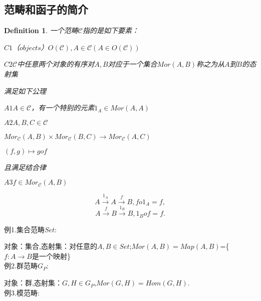 \documentclass[UTF8]{article}
\newtheorem{defn}{Definition}[section]
\begin{document}
\subsection{范畴和函子的简介}
\begin{defn}
一个范畴$\mathscr{C}$指的是如下要素：

\qquad$C1$（$objects$）$O(\mathscr{C}),A\in \mathscr{C}(A\in O(\mathscr{C}))$

\qquad$C2$$\mathscr{C}$中任意两个对象的有序对$A,B$对应于一个集合$Mor(A,B)$称之为从$A$到$B$的态射集

满足如下公理

$A1$$A\in \mathscr{C}$，有一个特别的元素$1_{A}\in Mor(A,A)$

$A2$$A,B,C\in \mathscr{C}$

\qquad\qquad\qquad$Mor_{\mathscr{C}}(A,B)\times Mor_{\mathscr{C}}(B,C)\longrightarrow Mor_{\mathscr{C}}(A,C)$

\qquad\qquad\qquad\qquad\qquad\qquad\qquad\qquad$(f,g)\longmapsto gof$

且满足结合律

$A3$$f\in Mor_{\mathscr{C}}(A,B)$

$$A\xrightarrow{1_{A}}A\xrightarrow{f}B,fo1_{A}=f,$$
$$A\xrightarrow{f}B\xrightarrow{1_{B}}B,1_{B}of=f.$$
\end{defn}
例1.集合范畴$Set$:


对象：集合,态射集：对任意的$A,B\in Set$;$Mor(A,B)=Map(A,B)$=\{$f:A\longrightarrow B$是一个映射\}\\
例2.群范畴$G_{P}$:


对象：群,态射集：$G,H\in G_{P}$,$Mor(G,H)=Hom(G,H).$\\
例3.模范畴:
\end{document}
